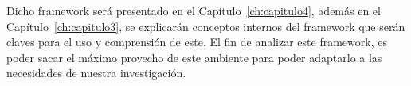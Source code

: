 Dicho framework será presentado en el Capítulo~\ref{ch:capitulo4}, además en el Capítulo~\ref{ch:capitulo3}, se explicarán conceptos internos del framework que serán claves para el uso y comprensión de este. El fin de analizar este framework, es poder sacar el máximo provecho de este ambiente para poder adaptarlo a las necesidades de nuestra investigación.




